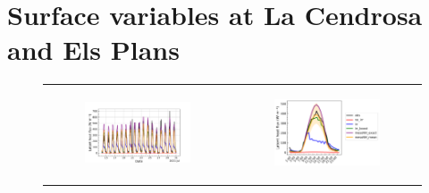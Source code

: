 

\section{Surface variables at La Cendrosa and Els Plans}

\begin{figure}[hbtp]
    \centering
    \begin{tabular}{cc}
        \begin{subfigure}[t]{0.5\textwidth}
            \caption{}
            \includegraphics[width=\textwidth]{images/chap5/time_series_cendrosa_flat.png}
        \end{subfigure} &
        \begin{subfigure}[t]{0.5\textwidth}
            \caption{}
            \includegraphics[width=\textwidth]{images/chap5/diurnal_cycle_cendrosa_flat.png}
        \end{subfigure} \\
        

\end{tabular}
\end{figure}
